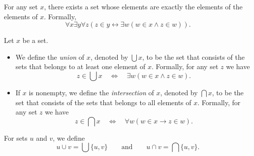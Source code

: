 \begin{axiom}[Union]
  For any set $x$, there exists a set whose elements are exactly the
  elements of the elements of $x$.
  Formally,
  \begin{equation*}
    \forall x \exists y \forall z
    (z \in y \leftrightarrow \exists w (w \in x \wedge z \in w)).
  \end{equation*}
\end{axiom}

\begin{definition}
  Let $x$ be a set.
  \begin{itemize}
    \item We define the \emph{union} of $x$, denoted by $\bigcup x$, to be the
    set that consists of the sets that belongs to at least one element of $x$.
    Formally, for any set $z$ we have
    \begin{equation*}
      z \in \bigcup x
      \quad \Leftrightarrow \quad
      \exists w (w \in x \wedge z \in w).
    \end{equation*}
    \item If $x$ is nonempty, we define the \emph{intersection} of $x$, denoted
    by $\bigcap x$, to be the set that consists of the sets that belongs to all
    elements of $x$.
    Formally, for any set $z$ we have
    \begin{equation*}
      z \in \bigcap x
      \quad \Leftrightarrow \quad
      \forall w (w \in x \to z \in w).
    \end{equation*}
  \end{itemize}
  For sets $u$ and $v$, we define
  \begin{equation*}
    u \cup v = \bigcup \{u, v\}
    \qquad \text{and} \qquad
    u \cap v = \bigcap \{u, v\}.
  \end{equation*}
\end{definition}